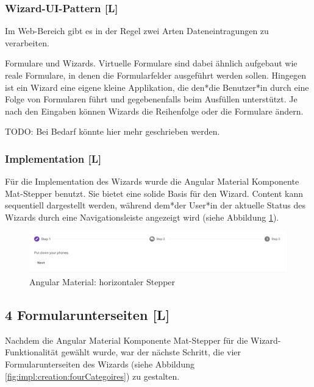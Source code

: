 \subsubsection{Wizard-UI-Pattern [L]}
Im Web-Bereich gibt es in der Regel zwei Arten Dateneintragungen zu verarbeiten.

Formulare und Wizards. Virtuelle Formulare sind dabei ähnlich aufgebaut wie reale Formulare, in denen die Formularfelder ausgeführt werden sollen. Hingegen ist ein Wizard eine eigene kleine Applikation, die den*die Benutzer*in durch eine Folge von Formularen führt und gegebenenfalls beim Ausfüllen unterstützt. Je nach den Eingaben können Wizards die Reihenfolge oder die Formulare ändern.

TODO: Bei Bedarf könnte hier mehr geschrieben werden. \cite[Wizards: Definition and Design Recommendations]{WizradsDefinitionAndRecommandation}

\subsubsection{Implementation [L]}
Für die Implementation des Wizards wurde die Angular Material Komponente Mat-Stepper benutzt. Sie bietet eine solide Basis für den Wizard. Content kann sequentiell dargestellt werden, während dem*der User*in der aktuelle Status des Wizards durch eine Navigationsleiste angezeigt wird (siehe Abbildung \ref{fig:impl:creation:mathorziontalstepper}). \cite{amStepper}

\begin{figure}
    \centering
    \includegraphics[scale=0.5]{pics/mathorziontalstepper.png}
    \caption{Angular Material: horizontaler Stepper \cite{amStepper}}
    \label{fig:impl:creation:mathorziontalstepper}
\end{figure}

\subsection{4 Formularunterseiten [L]}
Nachdem die Angular Material Komponente Mat-Stepper für die Wizard-Funktionalität gewählt wurde, war der nächste Schritt, die vier Formularunterseiten des Wizards (siehe Abbildung \ref{fig:impl:creation:fourCategoires}) zu gestalten.

